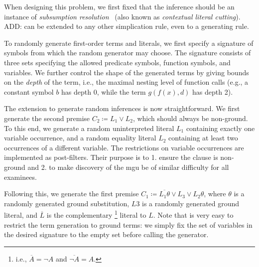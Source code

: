 When designing this problem,
we first fixed that the inference
should be an instance of \emph{subsumption resolution}~\cite{Vampire13}
(also known as \emph{contextual literal cutting}).
ADD: can be extended to any other simplication rule, even to a
generating rule.

To randomly generate first-order terms and literals,
we first specify a signature of symbols from which the random generator may choose.
The signature consists of three sets specifying the allowed
predicate symbols, %
function symbols, %
and variables.
We further control the shape of the generated terms
by giving bounds on the \emph{depth} of the term,
i.e., the maximal nesting level of function calls
(e.g., a constant symbol $b$ has depth 0, while the term $g(f(x),d)$ has depth 2).


The extension to generate random inferences is now straightforward.
We first generate the second premise $C_2 \coloneqq L_1 \lor L_2$, which should always be non-ground.
To this end, we generate a random uninterpreted literal $L_1$ containing exactly one variable occurrence,
and a random equality literal $L_2$ containing at least two occurrences of a different variable.
The restrictions on variable occurrences are implemented as post-filters.
Their purpose is to 1. ensure the clause is non-ground
and 2. to make discovery of the mgu be of similar difficulty for all examinees.


Following this, we generate the first premise $C_1 \coloneqq \overline{L_1\theta} \lor L_3 \lor L_2\theta$,
where $\theta$ is a randomly generated ground substitution,
$L3$ is a randomly generated ground literal,
and
$\overline{L}$ is the complementary%
\footnote{i.e., $\overline{A} = \lnot A$ and $\overline{\lnot A} = A$.}
literal to $L$.
Note that is very easy to restrict the term generation to ground terms:
we simply fix the set of variables in the desired signature to the empty set before calling the generator.


